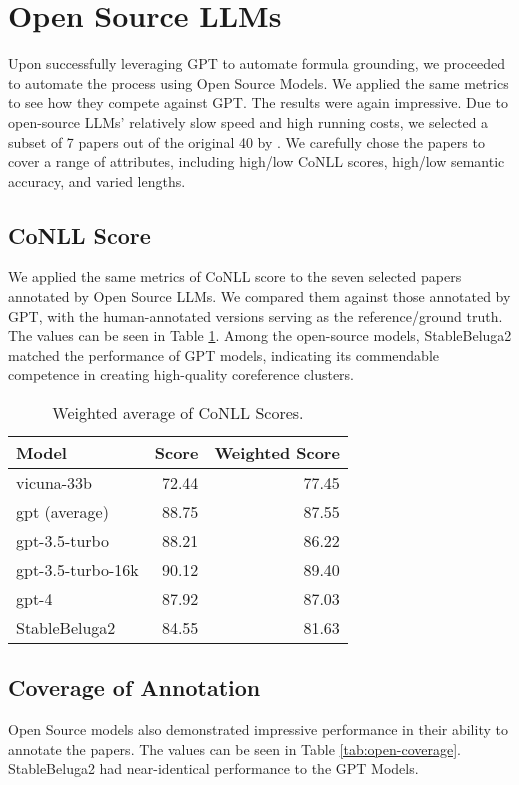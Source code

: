 \section{Open Source LLMs}
Upon successfully leveraging GPT to automate formula grounding, we proceeded to automate the process using Open Source Models. We applied the same metrics to see how they compete against GPT. The results were again impressive. Due to open-source LLMs' relatively slow speed and high running costs, we selected a subset of 7 papers out of the original 40 by \citet{asakura2022building}. We carefully chose the papers to cover a range of attributes, including high/low CoNLL scores, high/low semantic accuracy, and varied lengths.

\subsection{CoNLL Score}
We applied the same metrics of CoNLL score to the seven selected papers annotated by Open Source LLMs. We compared them against those annotated by GPT, with the human-annotated versions serving as the reference/ground truth. The values can be seen in Table \ref{tab:open-source-conll-score}. Among the open-source models, StableBeluga2 matched the performance of GPT models, indicating its commendable competence in creating high-quality coreference clusters.

\begin{table}[htpb]
  \centering
  \begin{tabular}{lrr}
    \hline
    Model & Score & Weighted Score \\
    \hline
    vicuna-33b & 72.44 & 77.45 \\
    gpt (average) & 88.75 & 87.55 \\
    gpt-3.5-turbo & 88.21 & 86.22 \\
    gpt-3.5-turbo-16k & 90.12 & 89.40 \\
    gpt-4 & 87.92 & 87.03 \\
    StableBeluga2 & 84.55 & 81.63 \\
    \hline
  \end{tabular}
  \caption[CoNLL Scores]{Weighted average of CoNLL Scores.}
  \label{tab:open-source-conll-score}
\end{table}

\subsection{Coverage of Annotation}
Open Source models also demonstrated impressive performance in their ability to annotate the papers. The values can be seen in Table \ref{tab:open-coverage}. StableBeluga2 had near-identical performance to the GPT Models.

